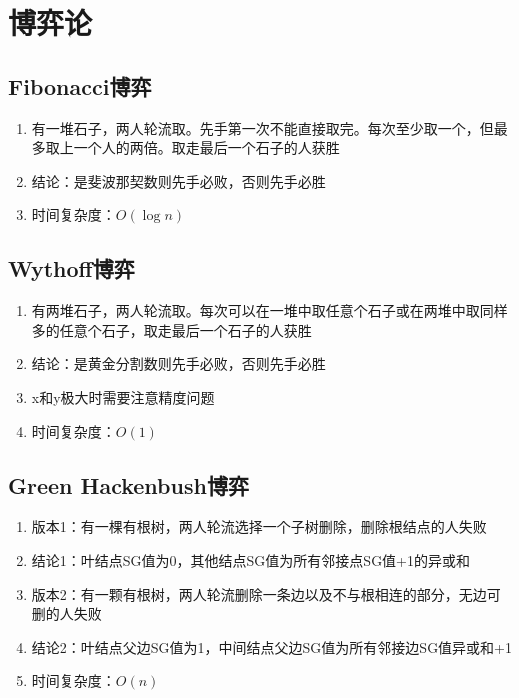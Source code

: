 \documentclass[twocolumn,a4,8pt]{article}  %
\begin{document}
	\section{博弈论}
		\subsection{Fibonacci博弈}
			\noindent\begin{enumerate}
				\item 有一堆石子，两人轮流取。先手第一次不能直接取完。每次至少取一个，但最多取上一个人的两倍。取走最后一个石子的人获胜
				\item 结论：是斐波那契数则先手必败，否则先手必胜
				\item 时间复杂度：$O(\log n)$
			\end{enumerate}
	 	 	
	 	 	
		\subsection{Wythoff博弈}
			\noindent\begin{enumerate}
				\item 有两堆石子，两人轮流取。每次可以在一堆中取任意个石子或在两堆中取同样多的任意个石子，取走最后一个石子的人获胜
				\item 结论：是黄金分割数则先手必败，否则先手必胜
				\item x和y极大时需要注意精度问题
				\item 时间复杂度：$O(1)$
			\end{enumerate}
	 	 	
	 	 	
		\subsection{Green Hackenbush博弈}
			\noindent\begin{enumerate}
				\item 版本1：有一棵有根树，两人轮流选择一个子树删除，删除根结点的人失败
				\item 结论1：叶结点SG值为0，其他结点SG值为所有邻接点SG值+1的异或和
				\item 版本2：有一颗有根树，两人轮流删除一条边以及不与根相连的部分，无边可删的人失败
				\item 结论2：叶结点父边SG值为1，中间结点父边SG值为所有邻接边SG值异或和+1
				\item 时间复杂度：$O(n)$
			\end{enumerate}
	 	 	
\end{document}

